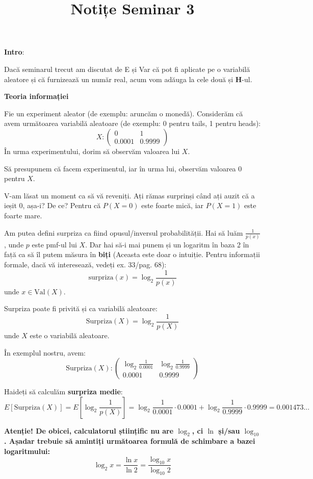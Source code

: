\documentclass[12pt]{article}
\title{%
	\textbf{Notițe Seminar 3}}
\begin{document}
	
	\maketitle
	
	\textbf{\large{Intro}}:
	
	Dacă seminarul trecut am discutat de E și Var că pot fi aplicate pe o variabilă aleatore și că furnizează un număr real, acum vom adăuga la cele două și \textbf{H}-ul.
	
	\textbf{\large{Teoria informației}}
	
	Fie un experiment aleator (de exemplu: aruncăm o monedă). Considerăm că avem următoarea variabilă aleatoare (de exemplu: 0 pentru tails, 1 pentru heads):
	$$X:\begin{pmatrix}
	0 & 1\\
	0.0001 & 0.9999
	\end{pmatrix}$$ 
	În urma experimentului, dorim să observăm valoarea lui $X$. 
	
	Să presupunem că facem experimentul, iar în urma lui, observăm valoarea 0 pentru $X$. 
	
	\newpage
	
	V-am lăsat un moment ca să vă reveniți. Ați rămas surprinși când ați auzit că a ieșit 0, așa-i? De ce? Pentru că $P(X = 0)$ este foarte mică, iar $P(X = 1)$ este foarte mare.
	
	Am putea defini surpriza ca fiind opusul/inversul probabilității. Hai să luăm $\frac{1}{p(x)}$, unde $p$ este pmf-ul lui $X$. Dar hai să-i mai punem și un logaritm în baza 2 în față ca să îl putem măsura în \textbf{biți} (Aceasta este doar o intuiție. Pentru informații formale, dacă vă interesează, vedeți ex. 33/pag. 68):
	$$\text{surpriza}(x) = \log_2\frac{1}{p(x)}$$
	unde $x \in \text{Val}(X)$.
	
	Surpriza poate fi privită și ca variabilă aleatoare:
	$$\text{Surpriza}(X) = \log_2 \frac{1}{p(X)}$$
	unde $X$ este o variabilă aleatoare.
	
	În exemplul nostru, avem:
	$$\text{Surpriza}(X) : \begin{pmatrix}
	\log_2 \frac{1}{0.0001} & \log_2 \frac{1}{0.9999}\\
	0.0001&0.9999
	\end{pmatrix}$$
	
	Haideți să calculăm \textbf{surpriza medie}:
	$$E[\text{Surpriza}(X)] = E[\log_2 \frac{1}{p(X)}] = \log_2 \frac{1}{0.0001} \cdot 0.0001 + \log_2 \frac{1}{0.9999} \cdot 0.9999 = 0.001473...$$
	
	\textbf{Atenție! De obicei, calculatorul științific nu are $\log_2$, ci $\ln$ și/sau $\log_{10}$. Așadar trebuie să amintiți următoarea formulă de schimbare a bazei logaritmului:
		$$\log_2 x = \frac{\ln x}{\ln 2} = \frac{\log_{10} x}{\log_{10} 2}$$}
	
\end{document}
